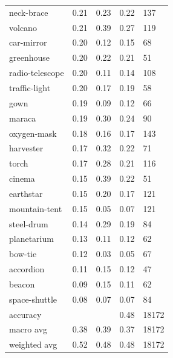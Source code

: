 \begin{center}
\begin{longtable}{lllll}
neck-brace & 0.21 & 0.23 & 0.22 & 137 \\
volcano & 0.21 & 0.39 & 0.27 & 119 \\
car-mirror & 0.20 & 0.12 & 0.15 & 68 \\
greenhouse & 0.20 & 0.22 & 0.21 & 51 \\
radio-telescope & 0.20 & 0.11 & 0.14 & 108 \\
traffic-light & 0.20 & 0.17 & 0.19 & 58 \\
gown & 0.19 & 0.09 & 0.12 & 66 \\
maraca & 0.19 & 0.30 & 0.24 & 90 \\
oxygen-mask & 0.18 & 0.16 & 0.17 & 143 \\
harvester & 0.17 & 0.32 & 0.22 & 71 \\
torch & 0.17 & 0.28 & 0.21 & 116 \\
cinema & 0.15 & 0.39 & 0.22 & 51 \\
earthstar & 0.15 & 0.20 & 0.17 & 121 \\
mountain-tent & 0.15 & 0.05 & 0.07 & 121 \\
steel-drum & 0.14 & 0.29 & 0.19 & 84 \\
planetarium & 0.13 & 0.11 & 0.12 & 62 \\
bow-tie & 0.12 & 0.03 & 0.05 & 67 \\
accordion & 0.11 & 0.15 & 0.12 & 47 \\
beacon & 0.09 & 0.15 & 0.11 & 62 \\
space-shuttle & 0.08 & 0.07 & 0.07 & 84 \\
\midrule
accuracy &  &  & 0.48 & 18172 \\
macro avg & 0.38 & 0.39 & 0.37 & 18172 \\
weighted avg & 0.52 & 0.48 & 0.48 & 18172 \\
\bottomrule
\end{longtable}
\end{center}

